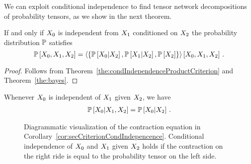 We can exploit conditional independence to find tensor network decompositions of probability tensors, as we show in the next theorem.

\begin{corollary}\label{cor:secCriterionCondIndepencence}
	If and only if $X_{0}$ is independent from $X_{1}$ conditioned on $X_{2}$ the probability distribution $\mathbb{P}$ satisfies
		\[ \mathbb{P}\left[X_{0}, X_{1}, X_{2}\right] 
		= \left\langle 
			\{ \mathbb{P}\left[X_{0}|X_{2}\right], \mathbb{P}\left[X_{1}|X_{2}\right], \mathbb{P}\left[X_{2}\right] \}
		\right\rangle \left[ 
			X_{0}, X_{1}, X_{2}
		 \right] \, .
		\]
\end{corollary}
\begin{proof}
	Follows from Theorem~\ref{the:condIndependenceProductCriterion} and Theorem~\ref{the:bayes}.
\end{proof}


\begin{corollary}\label{cor:conditionDropping}
	Whenever $X_{0}$ is independent of $X_{1}$ given $X_{2}$, we have
	\begin{align*}
		\mathbb{P}\left[X_{0}|X_{1},X_{2}\right] = \mathbb{P}\left[X_{0}|X_{2}\right] \, .
	\end{align*}
\end{corollary}


\begin{figure}[h]
\begin{center}
	
\end{center}
\caption{Diagrammatic visualization of the contraction equation in Corollary~\ref{cor:secCriterionCondIndepencence}. Conditional independence of $X_{0}$ and $X_{1}$ given $X_{2}$ holds if the contraction on the right ride is equal to the probability tensor on the left side.}
\end{figure}



